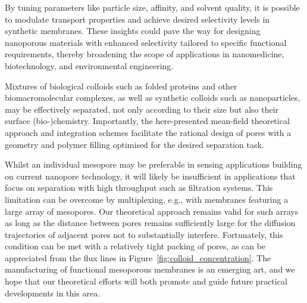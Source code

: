 \documentclass[12pt, a4paper]{article}
\begin{document}
By tuning parameters like particle size, affinity, and solvent quality, it is possible to modulate transport properties and achieve desired selectivity levels in synthetic membranes.
These insights could pave the way for designing nanoporous materials with enhanced selectivity tailored to specific functional requirements, thereby broadening the scope of applications in nanomedicine, biotechnology, and environmental engineering.

Mixtures of biological colloids such as folded proteins and other biomacromolecular complexes, as well as synthetic colloids such as nanoparticles, may be effectively separated, not only according to their size but also their surface (bio-)chemistry.
Importantly, the here-presented mean-field theoretical approach and integration schemes facilitate the rational design of pores with a geometry and polymer filling optimised for the desired separation task.

Whilst an individual mesopore may be preferable in sensing applications building on current nanopore technology, it will likely be insufficient in applications that focus on separation with high throughput such as filtration systems.
This limitation can be overcome by multiplexing, e.g., with membranes featuring a large array of mesopores.
Our theoretical approach remains valid for such arrays as long as the distance between pores remains sufficiently large for the diffusion trajectories of adjacent pores not to substantially interfere.
Fortunately, this condition can be met with a relatively tight packing of pores, as can be appreciated from the flux lines in  Figure~\ref{fig:colloid_concentration}.
The manufacturing of functional mesoporous membranes is an emerging art, and we hope that our theoretical efforts will both promote and guide future practical developments in this area. 


\end{document}
